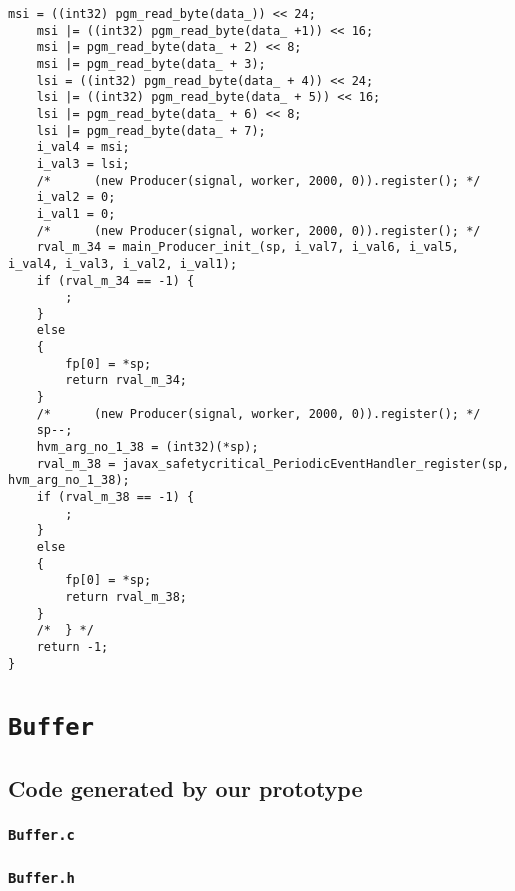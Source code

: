 \begin{lstlisting}[firstnumber=53949]
	msi = ((int32) pgm_read_byte(data_)) << 24;
	msi |= ((int32) pgm_read_byte(data_ +1)) << 16;
	msi |= pgm_read_byte(data_ + 2) << 8;
	msi |= pgm_read_byte(data_ + 3);
	lsi = ((int32) pgm_read_byte(data_ + 4)) << 24;
	lsi |= ((int32) pgm_read_byte(data_ + 5)) << 16;
	lsi |= pgm_read_byte(data_ + 6) << 8;
	lsi |= pgm_read_byte(data_ + 7);
	i_val4 = msi;
	i_val3 = lsi;
	/*		(new Producer(signal, worker, 2000, 0)).register(); */
	i_val2 = 0;
	i_val1 = 0;
	/*		(new Producer(signal, worker, 2000, 0)).register(); */
	rval_m_34 = main_Producer_init_(sp, i_val7, i_val6, i_val5, i_val4, i_val3, i_val2, i_val1);
	if (rval_m_34 == -1) {
		;
	}
	else
	{
		fp[0] = *sp;
		return rval_m_34;
	}
	/*		(new Producer(signal, worker, 2000, 0)).register(); */
	sp--;
	hvm_arg_no_1_38 = (int32)(*sp);
	rval_m_38 = javax_safetycritical_PeriodicEventHandler_register(sp, hvm_arg_no_1_38);
	if (rval_m_38 == -1) {
		;
	}
	else
	{
		fp[0] = *sp;
		return rval_m_38;
	}
	/*	} */
	return -1;
}
\end{lstlisting}

\section{\texorpdfstring{\texttt{Buffer}}{Buffer}}
\label{Buffer-code-section}


\subsection{Code generated by our prototype}
\label{Buffer-code-our-subsection}

\subsubsection{\texttt{Buffer.c}}


\subsubsection{\texttt{Buffer.h}}



% 

